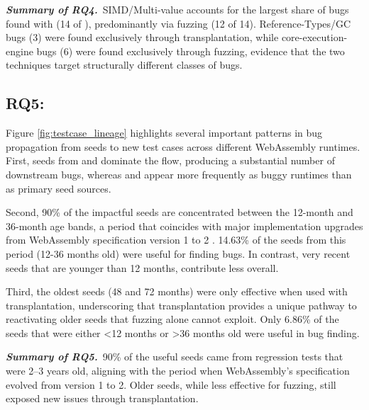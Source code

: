 \documentclass[lettersize,journal]{IEEEtran}
\begin{document}
\begin{tcolorbox}[rqbox]
\emph{\textbf{Summary of RQ4.}}~SIMD/Multi-value accounts for the largest share of bugs found with \tname{} (14 of \TotalBugs{}), predominantly via fuzzing (12 of 14). Reference-Types/GC bugs (3) were found exclusively through transplantation, while core-execution-engine bugs (6) were found exclusively through fuzzing, evidence that the two techniques target structurally different classes of bugs.

\end{tcolorbox}



\subsection{\textbf{RQ5: \rqfive{}}}
\label{sec:rqfive}

Figure \ref{fig:testcase_lineage} highlights several important patterns in bug propagation from seeds to new test cases across different WebAssembly runtimes. First, seeds from \wasmtime{} and \wamr{} dominate the flow, producing a substantial number of downstream bugs, whereas \wasmer{} and \wasmedge{} appear more frequently as buggy runtimes than as primary seed sources.

Second, 90\% of the impactful seeds are concentrated between the 12-month and 36-month age bands, a period that coincides with major implementation upgrades from WebAssembly specification version 1 to 2 \cite{changelog1, changelog2}. 14.63\% of the seeds from this period (12-36 months old) were useful for finding bugs. In contrast, very recent seeds that are younger than 12 months, contribute less overall.

Third, the oldest seeds (48 and 72 months) were only effective when used with transplantation, underscoring that transplantation provides a unique pathway to reactivating older seeds that fuzzing alone cannot exploit. Only 6.86\% of the seeds that were either \textless 12 months or \textgreater 36 months old were useful in bug finding.

\begin{tcolorbox}[rqbox]
\emph{\textbf{Summary of RQ5.}}~90\% of the useful seeds came from regression tests that were 2–3 years old, aligning with the period when WebAssembly’s specification evolved from version 1 to 2. Older seeds, while less effective for fuzzing, still exposed new issues through transplantation.
\end{tcolorbox}
\end{document}
